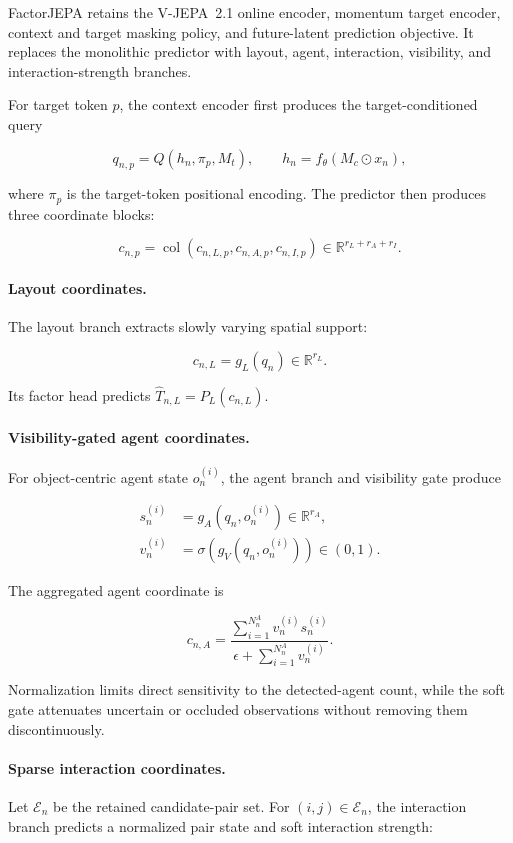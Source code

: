 FactorJEPA retains the V-JEPA~2.1 online encoder, momentum target
encoder, context and target masking policy, and future-latent prediction
objective. It replaces the monolithic predictor with layout, agent,
interaction, visibility, and interaction-strength branches.

For target token \(p\), the context encoder first produces the
target-conditioned query

\[
q_{n,p}
=
Q(h_n,\pi_p,M_t),
\qquad
h_n=f_\theta(M_c\odot x_n),
\]

where \(\pi_p\) is the target-token positional encoding. The predictor
then produces three coordinate blocks:

\[
c_{n,p}
=
\operatorname{col}
\left(
c_{n,L,p},
c_{n,A,p},
c_{n,I,p}
\right)
\in
\mathbb R^{r_L+r_A+r_I}.
\]

\paragraph{Layout coordinates.}
The layout branch extracts slowly varying spatial support:

\[
c_{n,L}=g_L(q_n)\in\mathbb R^{r_L}.
\]

Its factor head predicts
\(\widehat T_{n,L}=P_L(c_{n,L})\).

\paragraph{Visibility-gated agent coordinates.}
For object-centric agent state \(o_n^{(i)}\), the agent branch and
visibility gate produce

\begin{equation*}
\begin{aligned}
s_n^{(i)}
&=
g_A\!\left(q_n,o_n^{(i)}\right)
\in\mathbb{R}^{r_A},
\\
v_n^{(i)}
&=
\sigma\!\left(
g_V\!\left(q_n,o_n^{(i)}\right)
\right)
\in(0,1).
\end{aligned}
\end{equation*}

The aggregated agent coordinate is

\[
c_{n,A}
=
\frac{
\sum_{i=1}^{N_n^A}
v_n^{(i)}s_n^{(i)}
}{
\epsilon+
\sum_{i=1}^{N_n^A}v_n^{(i)}
}.
\]

Normalization limits direct sensitivity to the detected-agent count,
while the soft gate attenuates uncertain or occluded observations
without removing them discontinuously.

\paragraph{Sparse interaction coordinates.}
Let \(\mathcal E_n\) be the retained candidate-pair set. For
\((i,j)\in\mathcal E_n\), the interaction branch predicts a normalized
pair state and soft interaction strength:

